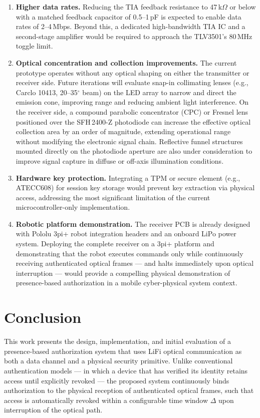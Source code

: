 \documentclass[conference]{IEEEtran}
\begin{document}
\begin{enumerate}
\item \textbf{Higher data rates.} Reducing the TIA feedback resistance to 47\,k$\Omega$ or below with a matched feedback capacitor of 0.5--1\,pF is expected to enable data rates of 2--4\,Mbps. Beyond this, a dedicated high-bandwidth TIA IC and a second-stage amplifier would be required to approach the TLV3501's 80\,MHz toggle limit.

\item \textbf{Optical concentration and collection improvements.} The current prototype operates without any optical shaping on either the transmitter or receiver side. Future iterations will evaluate snap-in collimating lenses (e.g., Carclo 10413, 20--35$^\circ$ beam) on the LED array to narrow and direct the emission cone, improving range and reducing ambient light interference. On the receiver side, a compound parabolic concentrator (CPC) or Fresnel lens positioned over the SFH\,2400-Z photodiode can increase the effective optical collection area by an order of magnitude, extending operational range without modifying the electronic signal chain. Reflective funnel structures mounted directly on the photodiode aperture are also under consideration to improve signal capture in diffuse or off-axis illumination conditions.

\item \textbf{Hardware key protection.} Integrating a TPM or secure element (e.g., ATECC608) for session key storage would prevent key extraction via physical access, addressing the most significant limitation of the current microcontroller-only implementation.

\item \textbf{Robotic platform demonstration.} The receiver PCB is already designed with Pololu 3pi+ robot integration headers and an onboard LiPo power system. Deploying the complete receiver on a 3pi+ platform and demonstrating that the robot executes commands only while continuously receiving authenticated optical frames --- and halts immediately upon optical interruption --- would provide a compelling physical demonstration of presence-based authorization in a mobile cyber-physical system context.
\end{enumerate}

\section{Conclusion}

This work presents the design, implementation, and initial evaluation of a presence-based authorization system that uses LiFi optical communication as both a data channel and a physical security primitive. Unlike conventional authentication models --- in which a device that has verified its identity retains access until explicitly revoked --- the proposed system continuously binds authorization to the physical reception of authenticated optical frames, such that access is automatically revoked within a configurable time window $\Delta$ upon interruption of the optical path.
\end{document}
